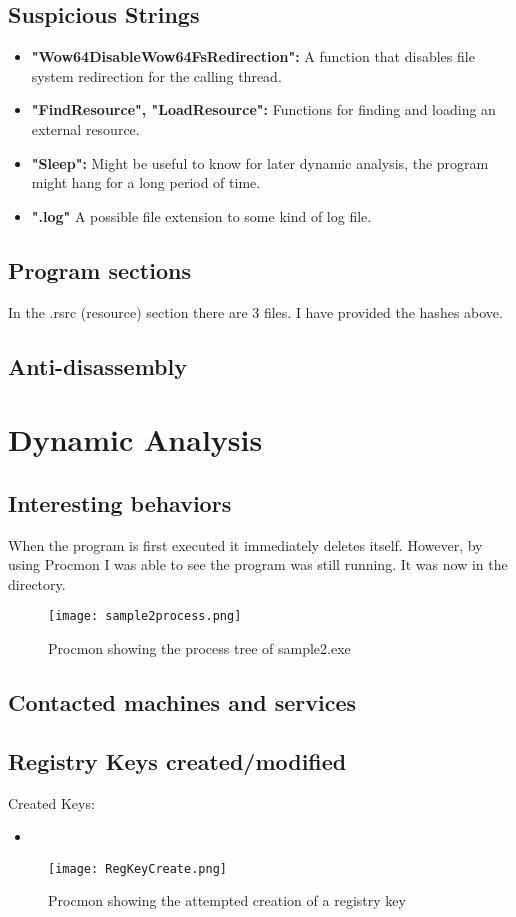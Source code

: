 \documentclass{article}
\begin{document}
    \subsection{Suspicious Strings}
    \begin{itemize}
        \item \textbf{"Wow64DisableWow64FsRedirection":} A function that disables file system redirection for the calling thread.
        \item \textbf{"FindResource", "LoadResource":} Functions for finding and loading an external resource.
        \item \textbf{"Sleep":} Might be useful to know for later dynamic analysis, the program might hang for a long period of time.
        \item \textbf{".log"} A possible file extension to some kind of log file.
    \end{itemize}

    \subsection{Program sections}
    In the .rsrc (resource) section there are 3 files. I have provided the hashes above.

    \subsection{Anti-disassembly}

    \section{Dynamic Analysis}
    \subsection{Interesting behaviors}
    When the program is first executed it immediately deletes itself. However, by using Procmon I was able to see the program was still running. It was now in the  directory.
    \begin{figure}[h]
        \texttt{[image: sample2process.png]}
        \caption{Procmon showing the process tree of sample2.exe}
    \end{figure}
    \subsection{Contacted machines and services}
    \subsection{Registry Keys created/modified}
    Created Keys:
    \begin{itemize}
        \item {}
    \end{itemize}
    \begin{figure}[h]
        \texttt{[image: RegKeyCreate.png]}
        \caption{Procmon showing the attempted creation of a registry key}
    \end{figure}
\end{document}
